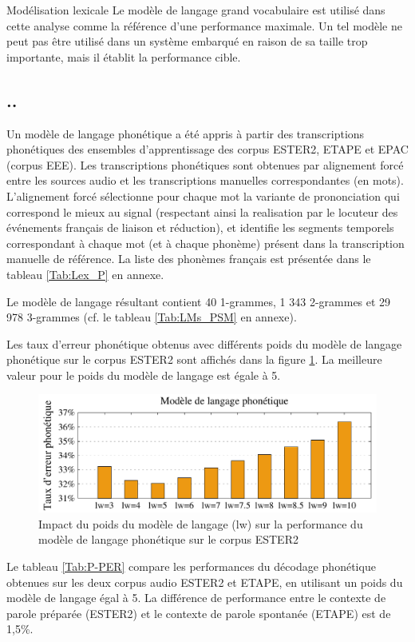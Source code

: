 \documentclass{style/these}
\newcommand{\hiddensubsection}[1]{
    \stepcounter{subsection}
    \subsection*{\arabic{chapter}.\arabic{section}.\arabic{subsection}\hspace{1em}{#1}}
}
\begin{document}
\begin{part}{Modélisation lexicale}
Le modèle de langage grand vocabulaire est utilisé dans cette analyse comme la référence d'une performance maximale. 
Un tel modèle ne peut pas être utilisé dans un système embarqué en raison de sa taille trop importante, mais il établit la performance cible. 


\hiddensubsection{Phonèmes}

Un modèle de langage phonétique a été appris à partir des transcriptions phonétiques des ensembles d'apprentissage des corpus ESTER2, ETAPE et EPAC (corpus EEE). Les transcriptions phonétiques sont obtenues par alignement forcé entre les sources audio et les transcriptions manuelles correspondantes (en mots). 
L'alignement forcé sélectionne pour chaque mot la variante de prononciation qui correspond le mieux au signal (respectant ainsi la realisation par le locuteur des événements français de liaison et réduction), et identifie les segments temporels correspondant à chaque mot (et à chaque phonème) présent dans la transcription manuelle de référence.
La liste des phonèmes français est présentée dans le tableau \ref{Tab:Lex_P} en annexe.

Le modèle de langage résultant contient 40 1-grammes, 1 343 2-grammes et 29 978 3-grammes (cf. le tableau \ref{Tab:LMs_PSM} en annexe).

Les taux d'erreur phonétique obtenus avec différents poids du modèle de langage phonétique sur le corpus ESTER2 sont affichés dans la figure \ref{Fig:ML-P-lw-ESTER2}. 
La meilleure valeur pour le poids du modèle de langage est égale à 5. 

\begin{figure}[h!]
\centering
\includegraphics[scale=0.78]{images/results/results_phones_lw_ESTER_v3.pdf}
\caption{Impact du poids du modèle de langage (lw) sur la performance du modèle de langage phonétique sur le corpus ESTER2}
\label{Fig:ML-P-lw-ESTER2}
\end{figure}

Le tableau \ref{Tab:P-PER} compare les performances du décodage phonétique obtenues sur les deux corpus audio ESTER2 et ETAPE, en utilisant un poids du modèle de langage égal à 5. 
La différence de performance entre le contexte de parole préparée (ESTER2) et le contexte de parole spontanée (ETAPE) est de 1,5\%. 


\end{part}
\end{document}
